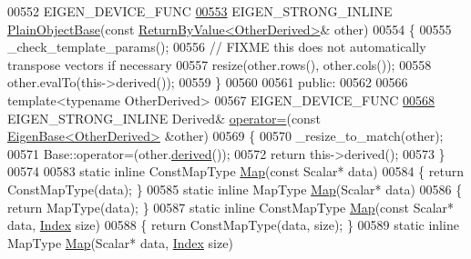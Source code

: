 \begin{DoxyCode}
00552     EIGEN\_DEVICE\_FUNC
\hyperlink{class_eigen_1_1_plain_object_base_abb80b2ee27de8b5d7ef2c8fb403c0068}{00553}     EIGEN\_STRONG\_INLINE \hyperlink{class_eigen_1_1_plain_object_base_abb80b2ee27de8b5d7ef2c8fb403c0068}{PlainObjectBase}(\textcolor{keyword}{const} 
      \hyperlink{group___core___module_class_eigen_1_1_return_by_value}{ReturnByValue<OtherDerived>}& other)
00554     \{
00555       \_check\_template\_params();
00556       \textcolor{comment}{// FIXME this does not automatically transpose vectors if necessary}
00557       resize(other.rows(), other.cols());
00558       other.evalTo(this->derived());
00559     \}
00560 
00561   \textcolor{keyword}{public}:
00562 
00566     \textcolor{keyword}{template}<\textcolor{keyword}{typename} OtherDerived>
00567     EIGEN\_DEVICE\_FUNC 
\hyperlink{class_eigen_1_1_plain_object_base_a6d280056e43429f043e8b25262ee6153}{00568}     EIGEN\_STRONG\_INLINE Derived& \hyperlink{class_eigen_1_1_plain_object_base_a6d280056e43429f043e8b25262ee6153}{operator=}(\textcolor{keyword}{const} 
      \hyperlink{group___core___module_struct_eigen_1_1_eigen_base}{EigenBase<OtherDerived>} &other)
00569     \{
00570       \_resize\_to\_match(other);
00571       Base::operator=(other.\hyperlink{group___core___module_a324b16961a11d2ecfd2d1b7dd7946545}{derived}());
00572       \textcolor{keywordflow}{return} this->derived();
00573     \}
00574 
00583     \textcolor{keyword}{static} \textcolor{keyword}{inline} ConstMapType \hyperlink{group___core___module_class_eigen_1_1_map}{Map}(\textcolor{keyword}{const} Scalar* data)
00584     \{ \textcolor{keywordflow}{return} ConstMapType(data); \}
00585     \textcolor{keyword}{static} \textcolor{keyword}{inline} MapType \hyperlink{group___core___module_class_eigen_1_1_map}{Map}(Scalar* data)
00586     \{ \textcolor{keywordflow}{return} MapType(data); \}
00587     \textcolor{keyword}{static} \textcolor{keyword}{inline} ConstMapType \hyperlink{group___core___module_class_eigen_1_1_map}{Map}(\textcolor{keyword}{const} Scalar* data, \hyperlink{namespace_eigen_a62e77e0933482dafde8fe197d9a2cfde}{Index} size)
00588     \{ \textcolor{keywordflow}{return} ConstMapType(data, size); \}
00589     \textcolor{keyword}{static} \textcolor{keyword}{inline} MapType \hyperlink{group___core___module_class_eigen_1_1_map}{Map}(Scalar* data, \hyperlink{namespace_eigen_a62e77e0933482dafde8fe197d9a2cfde}{Index} size)

\end{DoxyCode}
